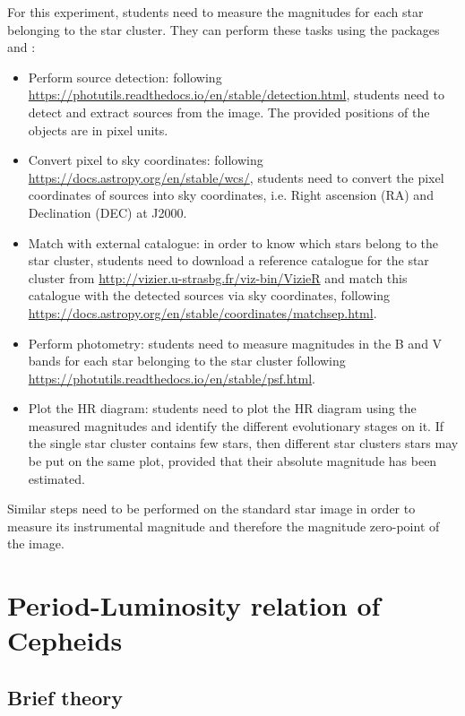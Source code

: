 \documentclass[a4paper, 11pt, fleqn]{memoir}
\begin{document}
For this experiment, students need to measure the magnitudes for each star belonging to the star cluster.
They can perform these tasks using the  packages  and :
\begin{itemize}
    \item Perform source detection: following \url{https://photutils.readthedocs.io/en/stable/detection.html}, students need to detect and extract sources from the image.
          The provided positions of the objects are in pixel units.
    \item
          Convert pixel to sky coordinates: following
          \url{https://docs.astropy.org/en/stable/wcs/}, students need to convert the
          pixel coordinates of sources into sky coordinates, i.e.
          Right ascension (RA) and Declination (DEC) at J2000.
    \item
          Match with external catalogue: in order to know which stars belong to the star
          cluster, students need to download a reference catalogue for the star cluster
          from \url{http://vizier.u-strasbg.fr/viz-bin/VizieR} and match this catalogue
          with the detected sources via sky coordinates, following
          \url{https://docs.astropy.org/en/stable/coordinates/matchsep.html}.
    \item
          Perform photometry: students need to measure magnitudes in the B and V bands
          for each star belonging to the star cluster following
          \url{https://photutils.readthedocs.io/en/stable/psf.html}.
    \item
          Plot the HR diagram: students need to plot the HR diagram using the measured
          magnitudes and identify the different evolutionary stages on it.
          If the single star cluster contains few stars, then different star clusters stars may be put on the same plot, provided that their absolute magnitude has been estimated.
\end{itemize}

Similar steps need to be performed on the standard star image in order to measure its instrumental magnitude and therefore the magnitude zero-point of the image.

\section{Period-Luminosity relation of Cepheids}

\subsection{Brief theory}
\end{document}
